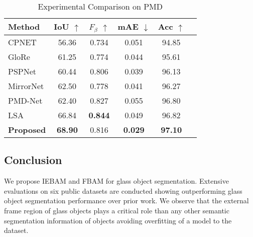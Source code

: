 \documentclass[10pt,twocolumn,letterpaper]{article}
\begin{document}
\begin{table}\scriptsize
    \centering
    \begin{tabular}{lccccc} %
    \toprule
    Method & IoU $\uparrow$ &${F}_{\beta}$ $\uparrow$ & mAE $\downarrow$ &Acc $\uparrow$ \\
    \midrule
    CPNET \cite{yu2020context}  &56.36 &0.734 &0.051& 94.85 \\
    GloRe \cite{chen2019graph} &61.25 &0.774 &0.044 & 95.61\\
    PSPNet  \cite{zhao2017pyramid} &60.44 &0.806    &0.039 &96.13  \\
    MirrorNet \cite{yang2019my} &62.50 & 0.778  &0.041  & 96.27\\
    PMD-Net \cite{lin2020progressive}  &62.40 & 0.827 &0.055    & 96.80 \\
    LSA  \cite{guan2022learning}&66.84 & \textbf{0.844} &0.049  & 96.82\\
    \midrule
    \textbf{Proposed} & \textbf{68.90} & 0.816 &\textbf{0.029} & \textbf{97.10}\\
    \bottomrule
    \end{tabular}
        \vspace*{-2mm}
    \caption{Experimental Comparison on PMD
    }    \vspace*{-4mm}
    \label{PMD}
\end{table}

\subsection{Conclusion}
We propose IEBAM and FBAM for glass object segmentation. Extensive evaluations on six public datasets are conducted showing outperforming glass object segmentation performance over prior work. We observe that the external frame region of glass objects plays a critical role than any other semantic segmentation information of objects avoiding overfitting of a model to the dataset.






{\small


}
\end{document}
